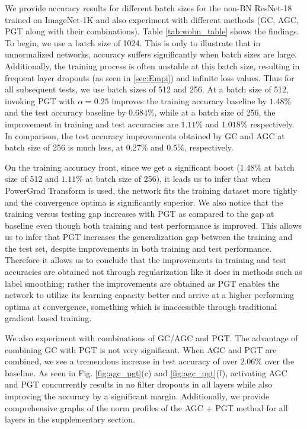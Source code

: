 \documentclass[times,sort&compress]{elsarticle}
\begin{document}
We provide accuracy results for different batch sizes for the non-BN ResNet-18 trained
on ImageNet-1K and also experiment with different methods (GC, AGC, PGT along with their
combinations). Table \ref{tab:wobn_table} shows the findings. To begin, we use a batch
size of 1024. This is only to illustrate that in unnormalized networks, accuracy suffers
significantly when batch sizes are large. Additionally, the training process is often
unstable at this batch size, resulting in frequent layer dropouts (as seen in
\ref{sec:Empi}) and infinite loss values. Thus for all subsequent tests, we use batch
sizes of 512 and 256. At a batch size of 512, invoking PGT with $\alpha=0.25$ improves
the training accuracy baseline by $1.48\%$ and the test accuracy baseline by $0.684\%$,
while at a batch size of 256, the improvement in training and test accuracies are
$1.11\%$ and $1.018\%$ respectively. In comparison, the test accuracy improvements
obtained by GC and AGC at batch size of 256 is much less, at $0.27\%$ and $0.5\%$,
respectively.

On the training accuracy front, since we get a significant boost ($1.48\%$ at batch size
of 512 and $1.11\%$ at batch size of 256), it leads us to infer that when PowerGrad
Transform is used, the network fits the training dataset more tightly and the
convergence optima is significantly superior. We also notice that the training versus
testing gap increases with PGT as compared to the gap at baseline even though both
training and test performance is improved. This allows us to infer that PGT increases
the generalization gap between the training and the test set, despite improvements in
both training and test performance. Therefore it allows us to conclude that the
improvements in training and test accuracies are obtained not through regularization
like it does in methods such as label smoothing; rather the improvements are obtained as
PGT enables the network to utilize its learning capacity better and arrive at a higher
performing optima at convergence, something which is inaccessible through traditional
gradient based training.

We also experiment with combinations of GC/AGC and PGT. The advantage of combining GC
with PGT is not very significant. When AGC and PGT are combined, we see a tremendous
increase in test accuracy of over $2.06\%$ over the baseline. As seen in Fig.
\ref{fig:agc_pgt}(c) and \ref{fig:agc_pgt}(f), activating AGC and PGT concurrently
results in no filter dropouts in all layers while also improving the accuracy by a
significant margin. Additionally, we provide comprehensive graphs of the norm profiles
of the AGC + PGT method for all layers in the supplementary section.
\end{document}
